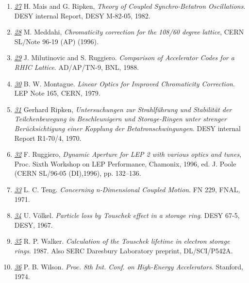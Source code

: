 \begin{enumerate}
	\item \href{mais}{\textit{27}} H. Mais and G. Ripken,
          \textit{Theory of Coupled Synchro-Betatron Oscillations}. DESY
          internal Report, DESY M-82-05, 1982. 

	\item \href{malika}{\textit{28}} M. Meddahi,
          \textit{Chromaticity correction for the 108/60 degree
            lattice}, CERN SL/Note 96-19 (AP) (1996). 

	\item \href{ruggiero}{\textit{29}} J. Milutinovic and
          S. Ruggiero. \textit{Comparison of Accelerator Codes for a
            RHIC Lattice}. AD/AP/TN-9, BNL, 1988. 
	\label{bib:ruggiero}

	\item \href{montague}{\textit{30}}
          B. W. Montague. \textit{Linear Optics for Improved
            Chromaticity Correction}. LEP Note 165, CERN, 1979. 
	\label{bib:montague}

	\item \href{ripken}{\textit{31}} Gerhard Ripken,
          \textit{Untersuchungen zur Strahlf\"uhrung und Stabilit\"at
            der Teilchenbewegung in Beschleunigern und Storage-Ringen
            unter strenger Ber\"ucksichtigung einer Kopplung der
            Betatronschwingungen}. DESY internal Report R1-70/4, 1970. 

	\item \href{chamonix96}{\textit{32}} F. Ruggiero,
          \textit{Dynamic Aperture for LEP 2 with various optics and
            tunes}, Proc. Sixth Workshop on LEP Performance, Chamonix,
          1996, ed. J. Poole (CERN SL/96-05 (DI),1996), pp. 132--136. 

	\item \href{teng}{\textit{33}} L. C. Teng. \textit{Concerning
          n-Dimensional Coupled Motion}. FN 229, FNAL, 1971. 

	\item \href{voelkel}{\textit{34}} U. V\"olkel. \textit{Particle
          loss by Touschek effect in a storage ring}. DESY 67-5, DESY,
          1967. 

	\item \href{walker}{\textit{35}}
          R. P. Walker. \textit{Calculation of the Touschek lifetime in
            electron storage rings}. 1987. Also SERC Daresbury
          Laboratory preprint, DL/SCI/P542A. 

	\item \href{wilson}{\textit{36}} P. B. Wilson. \textit{Proc. 8th
          Int. Conf. on High-Energy Accelerators}. Stanford, 1974. 


\end{enumerate}
